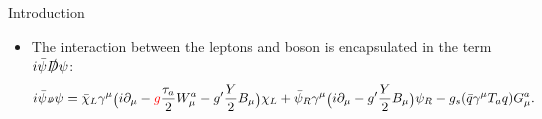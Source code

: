 \begin{frame}{Introduction}
    \vspace{0.05\textheight}
    \begin{itemize}
        \item The interaction between the leptons and \PW boson is encapsulated in the term $i\bar{\psi}\slashed{D}\psi$:
        \begin{equation*} \tiny
            i\bar{\psi}\slashed{D}\psi = 
            \bar{\chi}_L \gamma^\mu \big( i \partial_\mu  - \textcolor{red}{g} \frac{\tau_a}{2} W^a_\mu  -g'\frac{Y}{2} B_\mu \big) \chi_L 
            + \bar{\psi}_R \gamma^\mu \big( i \partial_\mu -g'\frac{Y}{2} B_\mu \big) \psi_R 
            - g_s (\bar{q}\gamma^\mu  T_{a} q) G_\mu^a .
        \end{equation*}
    \end{itemize}
\end{frame}



